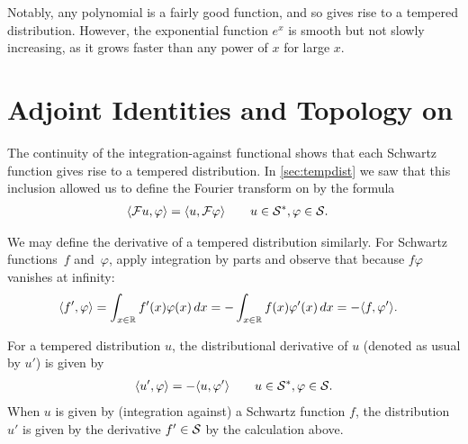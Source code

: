   Notably, any polynomial is a fairly good function, and so gives rise to a tempered distribution.
  However, the exponential function $e^x$ is smooth but not slowly increasing, as it grows faster than any power of $x$ for large $x$.
%

  \section{Adjoint Identities and Topology on \SS}
    The continuity of the integration-against functional shows that each Schwartz function gives rise to a tempered distribution.
    In \cref{sec:tempdist} we saw that this inclusion allowed us to define the Fourier transform on \SS by the formula
    \begin{align*}
      \langle\F u, \varphi\rangle &= \langle u, \F\varphi\rangle
      \qquad u\in\SS, \varphi\in\S \text{.}
    \end{align*}
    
    We may define the derivative of a tempered distribution similarly.
    For Schwartz functions~$f$ and~$\varphi$, apply integration by parts and observe that because $f\varphi$ vanishes at infinity:
    \begin{align*}
      \langle f', \varphi\rangle
      &= \int_{x\in\R} f'(x)\varphi(x)\,dx
      = -\int_{x\in\R} f(x)\varphi'(x)\,dx
      = -\langle f,\varphi'\rangle\text{.}
    \end{align*}
    \begin{defn}
      For a tempered distribution $u$, the distributional derivative of $u$ (denoted as usual by $u'$) is given by
      \begin{align*}
        \langle u', \varphi\rangle = -\langle u, \varphi'\rangle
        \qquad u\in\SS,\varphi\in\S \text{.}
      \end{align*}
      When $u$ is given by (integration against) a Schwartz function $f$, the distribution $u'$ is given by the derivative $f'\in\S$ by the calculation above. 
    \end{defn}
    
